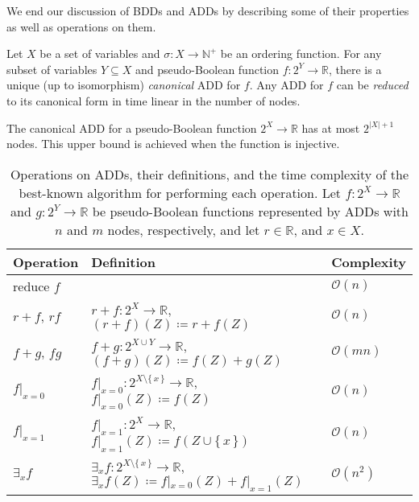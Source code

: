 We end our discussion of BDDs and ADDs by describing some of their properties as
well as operations on them.

\begin{fact}
  Let $X$ be a set of variables and $\sigma\colon X \to \mathbb{N}^+$ be an
  ordering function. For any subset of variables $Y \subseteq X$ and
  pseudo-Boolean function $f\colon 2^Y \to \mathbb{R}$, there is a unique (up to
  isomorphism) \emph{canonical} ADD for $f$. Any ADD for $f$ can be
  \emph{reduced} to its canonical form in time linear in the number of nodes.
\end{fact}

\begin{fact}\label{lemma:add_size}
  The canonical ADD for a pseudo-Boolean function $2^X \to \mathbb{R}$ has at
  most $2^{|X|+1}$ nodes. This upper bound is achieved when the function is
  injective.
\end{fact}

\begin{table}[t]
  \centering
  \begin{tabular}{lll}
    \toprule
    Operation & Definition & Complexity \\
    \midrule
    reduce $f$ & & $\mathcal{O}(n)$ \\
    $r+f$, $rf$ & $r+f\colon 2^X \to \mathbb{R}$, $(r+f)(Z) \coloneqq r+f(Z)$ & $\mathcal{O}(n)$ \\
    $f+g$, $fg$ & $f+g\colon 2^{X \cup Y} \to \mathbb{R}$, $(f+g)(Z) \coloneqq f(Z)+g(Z)$ & $\mathcal{O}(mn)$ \\
    $f|_{x=0}$ & $f|_{x=0}\colon 2^{X \setminus \{\,x\,\}} \to \mathbb{R}$, $f|_{x=0}(Z) \coloneqq f(Z)$ & $\mathcal{O}(n)$ \\
    $f|_{x=1}$ & $f|_{x=1}\colon 2^X \to \mathbb{R}$, $f|_{x=1}(Z) \coloneqq f(Z \cup \{\,x\,\})$ & $\mathcal{O}(n)$ \\
    $\exists_{x}f$ & $\exists_{x}f\colon 2^{X \setminus \{\,x\,\}} \to \mathbb{R}$, $\exists_{x}f(Z) \coloneqq f|_{x=0}(Z) + f|_{x=1}(Z)$ & $\mathcal{O}(n^2)$ \\
    \bottomrule
  \end{tabular}
  \caption{Operations on ADDs, their definitions, and the time complexity of the
    best-known algorithm for performing each operation. Let
    $f\colon 2^X \to \mathbb{R}$ and $g\colon 2^Y \to \mathbb{R}$ be
    pseudo-Boolean functions represented by ADDs with $n$ and $m$ nodes,
    respectively, and let $r \in \mathbb{R}$, and
    $x \in X$.}\label{tbl:complexity}
\end{table}

